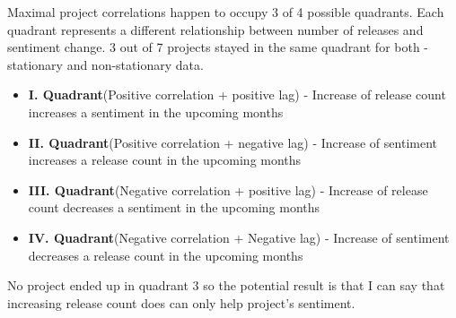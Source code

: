 Maximal project correlations happen to occupy 3 of 4 possible quadrants. Each quadrant represents a different relationship between number of releases and sentiment change. 3 out of 7 projects stayed in the same quadrant for both - stationary and non-stationary data.

\begin{itemize}
  \item \textbf{I. Quadrant}(Positive correlation + positive lag) - Increase of release count increases a sentiment in the upcoming months
  \item \textbf{II. Quadrant}(Positive correlation + negative lag) - Increase of sentiment increases a release count in the upcoming months
  \item \textbf{III. Quadrant}(Negative correlation + positive lag) - Increase of release count decreases a sentiment in the upcoming months
  \item \textbf{IV. Quadrant}(Negative correlation + Negative lag) - Increase of sentiment decreases a release count in the upcoming months
\end{itemize}

No project ended up in quadrant 3 so the potential result is that I can say that increasing release count does can only help project's sentiment.
